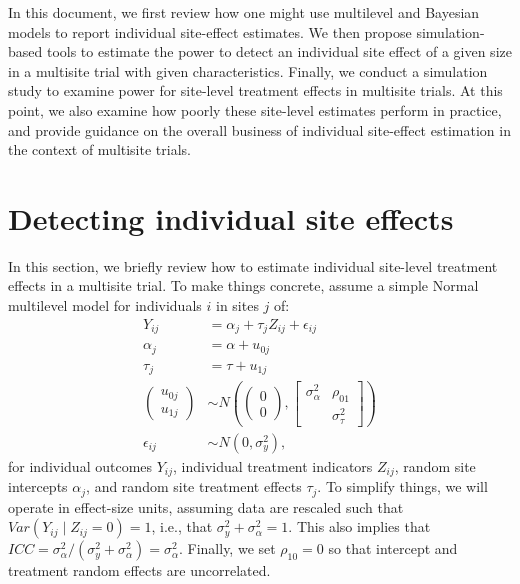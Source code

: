 \documentclass[]{article}
\begin{document}
In this document, we first review how one might use multilevel and Bayesian models to report individual site-effect estimates.
We then propose simulation-based tools to estimate the power to detect an individual site effect of a given size in a multisite trial with given characteristics.
Finally, we conduct a simulation study to examine power for site-level treatment effects in multisite trials.
At this point, we also examine how poorly these site-level estimates perform in practice, and provide guidance on the overall business of individual site-effect estimation in the context of multisite trials.


\section{Detecting individual site effects}

In this section, we briefly review how to estimate individual site-level treatment effects in a multisite trial.
To make things concrete, assume a simple Normal multilevel model for individuals $i$ in sites $j$ of: 
\begin{align*}
	Y_{ij} &= \alpha_j + \tau_j Z_{ij} + \epsilon_{ij} \\
	\alpha_j &= \alpha + u_{0j} \\
	\tau_j &= \tau + u_{1j} \\
	\begin{pmatrix}
		u_{0j} \\ u_{1j}
	\end{pmatrix} &\sim N\left(
	\begin{pmatrix}
		0 \\ 0
	\end{pmatrix}, 
	\begin{bmatrix}
		\sigma^2_\alpha & \rho_{01} \\  & \sigma^2_\tau
	\end{bmatrix}\right) \\
	\epsilon_{ij} &\sim N(0, \sigma^2_y) ,
\end{align*}
for individual outcomes $Y_{ij}$, individual treatment indicators $Z_{ij}$, random site intercepts $\alpha_j$, and random site treatment effects $\tau_j$.
To simplify things, we will operate in effect-size units, assuming data are rescaled such that $Var(Y_{ij} \mid Z_{ij}=0) = 1$, i.e., that $\sigma^2_y + \sigma^2_\alpha = 1$.
This also implies that $ICC = \sigma^2_\alpha / (\sigma^2_y + \sigma^2_\alpha) = \sigma^2_\alpha$.
Finally, we set $\rho_{10} = 0$ so that intercept and treatment random effects are uncorrelated.
\end{document}
